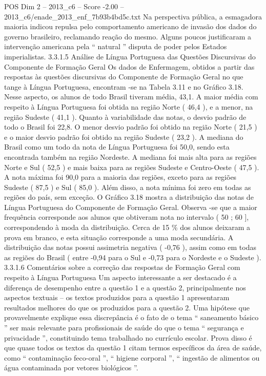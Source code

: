 \begin{textsample}{POS Dim 2 – 2013\_c6 – Score -2.00 – 2013\_c6/enade\_2013\_enf\_7b93b4bd5c.txt}
Na perspectiva pública, a esmagadora maioria indicou repulsa pelo comportamento americano de invasão dos dados do governo brasileiro, reclamando reação do mesmo.
Alguns poucos justificaram a intervenção americana pela “ natural ” disputa de poder pelos Estados imperialistas. 3.3.1.5 Análise de Língua Portuguesa das Questões Discursivas do Componente de Formação Geral Os dados de Enfermagem, obtidos a partir das respostas às questões discursivas do Componente de Formação Geral no que tange à Língua Portuguesa, encontram -se na Tabela 3.11 e no Gráfico 3.18.
Nesse aspecto, os alunos de todo Brasil tiveram média, 43,1.
A maior média com respeito à Língua Portuguesa foi obtida na região Norte ( 46,4 ), e a menor, na região Sudeste ( 41,1 ).
Quanto à variabilidade das notas, o desvio padrão de todo o Brasil foi 22,8.
O menor desvio padrão foi obtido na região Norte ( 21,5 ) e o maior desvio padrão foi obtido na região Sudeste ( 23,2 ).
A mediana do Brasil como um todo da nota de Língua Portuguesa foi 50,0, sendo esta encontrada também na região Nordeste.
A mediana foi mais alta para as regiões Norte e Sul ( 52,5 ) e mais baixa para as regiões Sudeste e Centro-Oeste ( 47,5 ).
A nota máxima foi 90,0 para a maioria das regiões, exceto para as regiões Sudeste ( 87,5 ) e Sul ( 85,0 ).
Além disso, a nota mínima foi zero em todas as regiões do país, sem exceção.
O Gráfico 3.18 mostra a distribuição das notas de Língua Portuguesa do Componente de Formação Geral.
Observa -se que a maior frequência corresponde aos alunos que obtiveram nota no intervalo ( 50 ; 60 ], correspondendo à moda da distribuição.
Cerca de 15 \% dos alunos deixaram a prova em branco, e esta situação corresponde a uma moda secundária.
A distribuição das notas possui assimetria negativa ( -0,76 ), assim como em todas as regiões do Brasil ( entre -0,94 para o Sul e -0,73 para o Nordeste e o Sudeste ). 3.3.1.6 Comentários sobre a correção das respostas de Formação Geral com respeito à Língua Portuguesa Um aspecto interessante a ser destacado é a diferença de desempenho entre a questão 1 e a questão 2, principalmente nos aspectos textuais – os textos produzidos para a questão 1 apresentaram resultados melhores do que os produzidos para a questão 2.
Uma hipótese que provavelmente explique essa discrepância é o fato de o tema “ saneamento básico ” ser mais relevante para profissionais de saúde do que o tema “ segurança e privacidade ”, constituindo tema trabalhado no currículo escolar.
Prova disso é que quase todos os textos da questão 1 citam termos específicos da área de saúde, como “ contaminação feco-oral ”, “ higiene corporal ”, “ ingestão de alimentos ou água contaminada por vetores biológicos ”.

\end{textsample}
